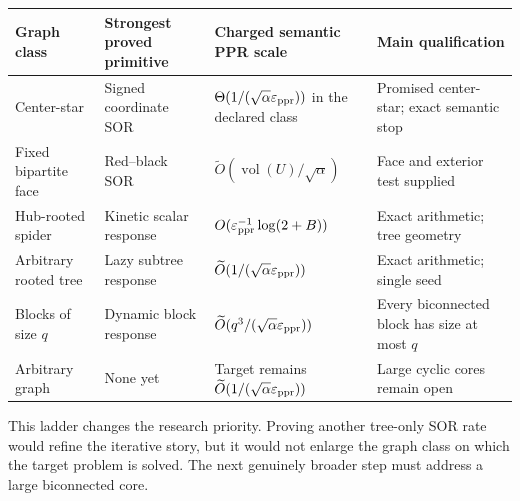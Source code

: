 \begin{center}
\begin{tabular}{p{}p{}p{}p{}}
\toprule
Graph class & Strongest proved primitive & Charged semantic PPR scale & Main
qualification \\
\midrule
Center-star & Signed coordinate SOR &
$\Theta(1/(\sqrt\alpha\varepsilon_{\rm ppr}))$ in the declared class &
Promised center-star; exact semantic stop \\
Fixed bipartite face & Red--black SOR &
$\widetilde O(\operatorname{vol}(U)/\sqrt\alpha)$ & Face and exterior test
supplied \\
Hub-rooted spider & Kinetic scalar response &
$O(\varepsilon_{\rm ppr}^{-1}\log(2+B))$ & Exact arithmetic; tree geometry
\\
Arbitrary rooted tree & Lazy subtree response &
$\widetilde O(1/(\sqrt\alpha\varepsilon_{\rm ppr}))$ & Exact arithmetic;
single seed \\
Blocks of size $q$ & Dynamic block response &
$\widetilde O(q^3/(\sqrt\alpha\varepsilon_{\rm ppr}))$ & Every biconnected
block has size at most $q$ \\
Arbitrary graph & None yet & Target remains
$\widetilde O(1/(\sqrt\alpha\varepsilon_{\rm ppr}))$ & Large cyclic cores
remain open \\
\bottomrule
\end{tabular}
\end{center}

This ladder changes the research priority.  Proving another tree-only SOR
rate would refine the iterative story, but it would not enlarge the graph
class on which the target problem is solved.  The next genuinely broader
step must address a large biconnected core.
